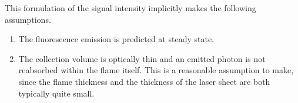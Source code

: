 This formulation of the signal intensity implicitly makes the following assumptions.
\begin{enumerate}
\item The fluorescence emission is predicted at steady state.
\item The collection volume is optically thin and an emitted photon is not reabsorbed within the flame itself.
This is a reasonable assumption to make, since the flame thickness and the thickness of the laser sheet are both typically quite small.
\end{enumerate}













